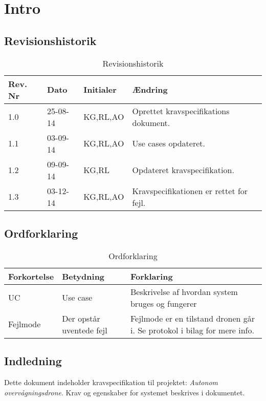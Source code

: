\chapter{Intro}

\section{Revisionshistorik}
\begin{table}[H]
	\centering
		\begin{tabular}{|p{2 cm}|p{2 cm}|p{3 cm}|p{6 cm}|} 
		\hline
			\textbf{Rev. Nr} & \textbf{Dato}		& \textbf{Initialer} 	& \textbf{Ændring} \\ \hline
			1.0 	& 25-08-14	& KG,RL,AO		& Oprettet kravspecifikations \newline dokument.	\\ \hline
			1.1 	& 03-09-14	& KG,RL,AO		& Use cases opdateret.\\ \hline
			1.2 	& 09-09-14	& KG,RL			& Opdateret kravspecifikation.\\ \hline
			1.3 	& 03-12-14	& KG,RL,AO		& Kravspecifikationen er rettet for fejl.\\ \hline
		\end{tabular}
	\caption{Revisionshistorik}
\end{table}

\vspace{1.5cm}

\section{Ordforklaring}
\begin{table}[H]
	\centering
		\begin{tabular}{|p{2.5cm}|p{4.5 cm}|p{6.5 cm}|} 
		\hline
			\textbf{Forkortelse} & \textbf{Betydning} & \textbf{Forklaring} \\ \hline
			UC & Use case & Beskrivelse af hvordan system bruges og fungerer \\ \hline
			Fejlmode & Der opstår uventede fejl & Fejlmode er en tilstand dronen går i. \newline Se protokol i bilag for mere info. \\ \hline
		\end{tabular}
	\caption{Ordforklaring}
\end{table}

\vspace{4cm}

\section{Indledning}

Dette dokument indeholder kravspecifikation til projektet: \textit{Autonom overvågningsdrone}. Krav og egenskaber for systemet beskrives i dokumentet.